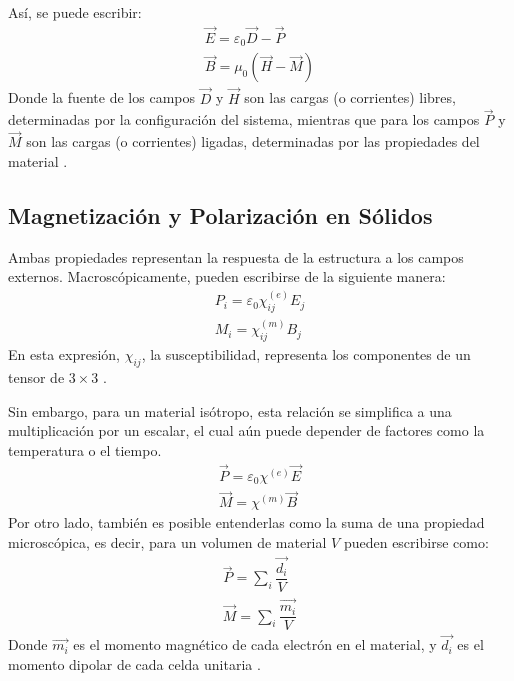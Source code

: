 \documentclass[../main.tex]{subfiles}
\begin{document}
Así, se puede escribir:
\begin{equation}
    \begin{split}
        \vec{E}=\varepsilon_0\vec{D}-\vec{P}\\
        \vec{B}=\mu_0(\vec{H}-\vec{M})
    \end{split}  
    \label{eq:maxwellmacro}
\end{equation}
Donde la fuente de los campos $\vec{D}$ y $\vec{H}$ son las cargas (o corrientes) libres, determinadas por la configuración del sistema, mientras que para los campos $\vec{P}$ y $\vec{M}$ son las cargas (o corrientes) ligadas, determinadas por las propiedades del material \cite{griffiths2023introduction}.
\subsection{Magnetización y Polarización en Sólidos}
Ambas propiedades representan la respuesta de la estructura a los campos externos. Macroscópicamente, pueden escribirse de la siguiente manera:
\begin{equation}
    \begin{split}
        P_{i}=\varepsilon_0\chi_{ij}^{(e)}E_j\\
        M_{i}=\chi_{ij}^{(m)}B_j
    \end{split}
    \label{eq:tensorMP}
\end{equation}
En esta expresión, $\chi_{ij}$, la susceptibilidad, representa los componentes de un tensor de $3\times3$ \cite{Damjanovic2006}.

Sin embargo, para un material isótropo, esta relación se simplifica a una multiplicación por un escalar, el cual aún puede depender de factores como la temperatura o el tiempo.
\begin{equation}
    \begin{split}
        \vec{P}=\varepsilon_0\chi^{(e)}\vec{E}\\
        \vec{M}=\chi^{(m)}\vec{B}
    \end{split}
    \label{eq:escalarMP}
\end{equation}
Por otro lado, también es posible entenderlas como la suma de una propiedad microscópica, es decir, para un volumen de material $V$ pueden escribirse como:
\begin{equation}
    \begin{split}
        \vec{P}=\sum_i \dfrac{\vec{d_i}}{V}\\
        \vec{M}=\sum_i \dfrac{\vec{m_i}}{V}
    \end{split}
    \label{eq:relacionmicromacro}
\end{equation}
Donde $\vec{m_i}$ es el momento magnético de cada electrón en el material, y $\vec{d_i}$ es el momento dipolar de cada celda unitaria \cite{Visintin2006}.
\end{document}
